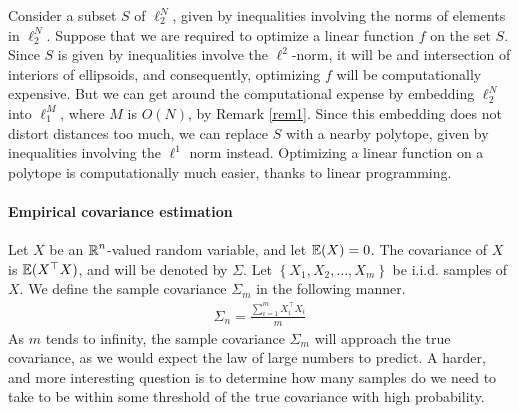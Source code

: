 \documentclass[11pt]{article}
\begin{document}
Consider a subset $S$ of $\ell_2^N$, given by inequalities involving the norms of elements in $\ell_2^N$.
Suppose that we are required to optimize a linear function $f$ on the set $S$.
Since $S$ is given by inequalities involve the $\ell^2$-norm, it will be and intersection of interiors of ellipsoids, and consequently, optimizing $f$ will be computationally expensive.
But we can get around the computational expense by embedding $\ell_2^N$ into $\ell_1^M$, where $M$ is $O(N)$, by Remark \ref{rem1}.
Since this embedding does not distort distances too much, we can replace $S$ with a nearby polytope, given by inequalities involving the $\ell^1$ norm instead.
Optimizing a linear function on a polytope is computationally much easier, thanks to linear programming.

\paragraph{Empirical covariance estimation}

Let $X$ be an $\operatorname{\mathbb{R}}^n$-valued random variable, and let $\mathbb{E}(X) = 0$.
The covariance of $X$ is $\mathbb{E}(X^{\top}X)$, and will be denoted by $\Sigma$.
Let $\left\{ X_1, X_2, \ldots, X_m \right\}$ be i.i.d. samples of $X$.
We define the sample covariance $\Sigma_m$ in the following manner.
\begin{align*}
  \Sigma_n = \frac{\sum_{i=1}^m X_i^{\top}X_i}{m}
\end{align*}
As $m$ tends to infinity, the sample covariance $\Sigma_m$ will approach the true covariance, as we would expect the law of large numbers to predict.
A harder, and more interesting question is to determine how many samples do we need to take to be within some threshold of the true covariance with high probability.
\end{document}

